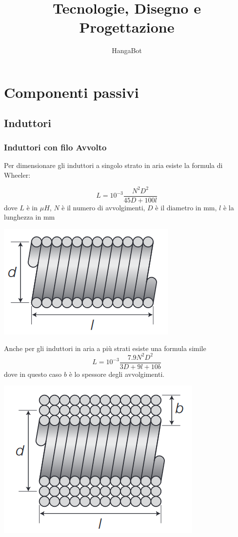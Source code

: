 \documentclass[10pt,a4paper]{book}
\author{HangaBot}
\title{Tecnologie, Disegno e Progettazione}
\begin{document}
\maketitle
\tableofcontents

\chapter{Componenti passivi}
\section{Induttori}
\subsection{Induttori con filo Avvolto}
Per dimensionare gli induttori a singolo strato in aria esiste la formula di Wheeler:

\begin{equation}
L = 10^{-3} \frac{N^2   D^2}{45 D + 100 l}
\end{equation}
dove $L$ è in $\mu H$, $N$ è il numero di avvolgimenti, $D$ è il diametro in mm,  $l$ è la lunghezza in mm

\begin{center}
\includegraphics[scale=1]{img/risonatori/bobina_singolo_strato.png} 
\label{FIG:Bobina_singolo_strato}
\end{center}

Anche per gli induttori in aria a più strati esiste una formula simile 
\begin{equation}
L = 10^{-3} \frac{7.9 N^2   D^2}{3 D + 9 l+10 b}
\end{equation}
dove in questo caso $b$ è lo spessore degli avvolgimenti.
\begin{center}
\includegraphics[scale=1]{img/risonatori/bobina_multi_strato.png} 
\label{FIG:Bobina_multi_strato}
\end{center}
\end{document}
